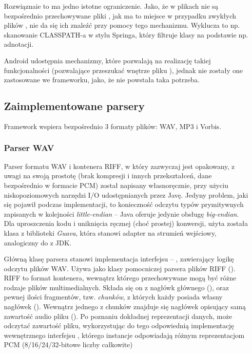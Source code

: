 Rozwiąznaie to ma jedno istotne ograniczenie. Jako, że w plikach  nie są bezpośrednio
przechowywane pliki , jak ma to miejsce w przypadku zwykłych plików , nie da
się ich znaleźć przy pomocy tego mechanizmu. Wyklucza to np. skanowanie CLASSPATH-a w stylu Springa,
który filtruje klasy na podstawie np. adnotacji. 

\begin{Note}
Android udostępnia mechanizmy, które pozwalają na realizację takiej funkcjonalności (pozwalające
przeszukać wnętrze pliku ), jednak nie zostały one zastosowane we frameworku,
jako, że nie powstała taka potrzeba.  
\end{Note}


\subsection{Zaimplementowane parsery}

Framework wspiera bezpośrednio 3 formaty plików: WAV, MP3 i Vorbis.

\subsubsection{Parser WAV}

Parser formatu WAV i kontenera RIFF, w który zazwyczaj jest opakowany, z uwagi na swoją prostotę
(brak kompresji i innych przekształceń, dane bezpośrednio w formacie PCM) został napisany
własnoręcznie, przy użyciu niskopoziomowych narzędzi I/O udostępnianych przez Javę. Jedyny problem,
jaki się pojawił podczas implementacji, to konieczność odczytu typów prymitywnych zapisanych w
kolejności \textit{little-endian} -- Java oferuje jedynie obsługę \textit{big-endian}. Dla
uproszczenia kodu i uniknięcia ręcznej (choć prostej) konwersji, użyta została klasa
 z biblioteki \emph{Guava}, która stanowi adapter na strumień
wejściowy, analogiczny do  z JDK.


Główną klasę parsera stanowi implementacja interfejsu  -- ,
zawierający logikę odczytu plików WAV. Używa jako klasy pomocniczej parsera plików RIFF
(). RIFF to format kontenera, wewnątrz którego przechowywane mogą być różne rodzaje
plików multimedialnych. Składa się on z nagłówk głównego (), oraz pewnej ilości
fragmentów, tzw. \textit{chunków}, z których każdy posiada własny nagłówek ().
Wewnątrz jednego z chunków znajduje się nagłówek opisujący samą zawartość audio pliku
(). Po poznaniu dokładnej reprezentacji danych,  może odczytać
zawartość pliku, wykorzystując do tego odpowiednią implementację wewnętrznego interfejsu
, którego instancje odpowiadają różnym reprezentacjom PCM (8/16/24/32-bitowe liczby
całkowite)

